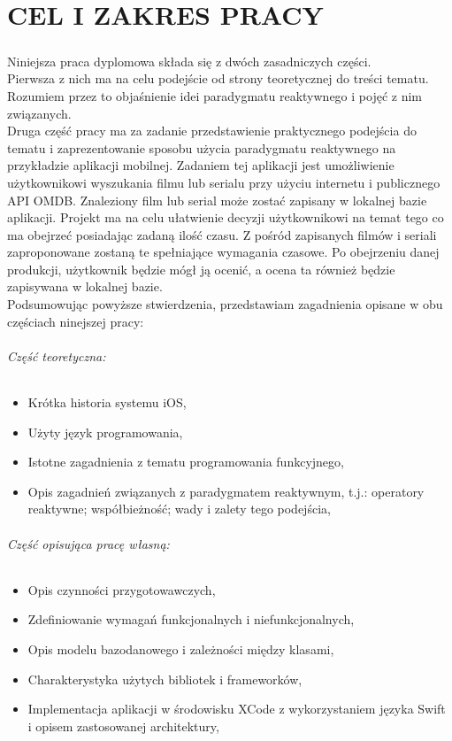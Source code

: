 \documentclass[12pt,oneside,a4paper]{report}
\begin{document}
\chapter{CEL I ZAKRES PRACY}
\paragraph{}Niniejsza praca dyplomowa składa się z dwóch zasadniczych części.\\Pierwsza z nich ma na celu podejście od strony teoretycznej do treści tematu. Rozumiem przez to objaśnienie idei paradygmatu reaktywnego i pojęć z nim związanych.\\Druga część pracy ma za zadanie przedstawienie praktycznego podejścia do tematu i zaprezentowanie sposobu użycia paradygmatu reaktywnego na przykładzie aplikacji mobilnej. Zadaniem tej aplikacji jest umożliwienie użytkownikowi wyszukania filmu lub serialu przy użyciu internetu i publicznego API OMDB. Znaleziony film lub serial może zostać zapisany w lokalnej bazie aplikacji. Projekt ma na celu ułatwienie decyzji użytkownikowi na temat tego co ma obejrzeć posiadając zadaną ilość czasu. Z pośród zapisanych filmów i seriali zaproponowane zostaną te spełniające wymagania czasowe. Po obejrzeniu danej produkcji, użytkownik będzie mógł ją ocenić, a ocena ta również będzie zapisywana w lokalnej bazie.\\
Podsumowując powyższe stwierdzenia, przedstawiam zagadnienia opisane w obu częściach ninejszej pracy:
\subparagraph{Część teoretyczna:}
\begin{itemize}
	\item Krótka historia systemu iOS,
	\item Użyty język programowania,
	\item Istotne zagadnienia z tematu programowania funkcyjnego,
	\item Opis zagadnień związanych z paradygmatem reaktywnym, t.j.: operatory reaktywne; współbieżność; wady i zalety tego podejścia,
\end{itemize}
\subparagraph{Część opisująca pracę własną:}

\begin{itemize}
	\item Opis czynności przygotowawczych,
	\item Zdefiniowanie wymagań funkcjonalnych i niefunkcjonalnych,
	\item Opis modelu bazodanowego i zależności między klasami,
	\item Charakterystyka użytych bibliotek i frameworków,
	\item Implementacja aplikacji w środowisku XCode z wykorzystaniem języka Swift i opisem zastosowanej architektury,
\end{itemize}
\end{document}
